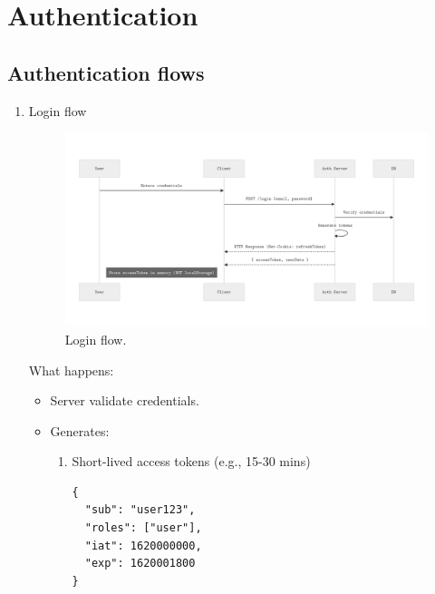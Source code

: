 \documentclass[a4paper,10pt]{article}
\begin{document}

\section{Authentication}

\subsection{Authentication flows}
\begin{enumerate}
    \item Login flow
          \begin{figure}[H]
              \centering
              \includegraphics[width=\textwidth]{images/login-flow.png}
              \caption{Login flow.}
              \label{fig:login_flow}
          \end{figure}

          What happens:
          \begin{itemize}
              \item Server validate credentials.
              \item Generates:
                    \begin{enumerate}
                        \item Short-lived access tokens (e.g., 15-30 mins)
                              \begin{verbatim}
{
  "sub": "user123",
  "roles": ["user"],
  "iat": 1620000000,
  "exp": 1620001800
}
                                

\end{verbatim}
\end{enumerate}
\end{itemize}
\end{enumerate}
\end{document}
